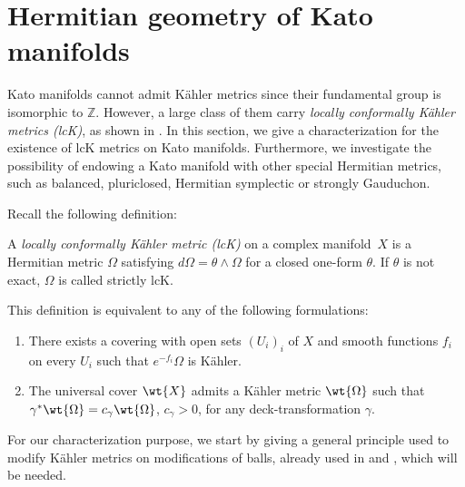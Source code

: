 \section{Hermitian geometry of Kato manifolds}\label{metrici}

Kato manifolds cannot admit Kähler metrics since their fundamental group is isomorphic to $\mathbb{Z}$. However, a large class of them carry \emph{locally conformally Kähler metrics (lcK)}, as shown in \cite[Th.\,2.2]{iop}. In this section, we give a characterization for the existence of lcK metrics on Kato manifolds. Furthermore, we investigate the possibility of endowing a Kato manifold with other special Hermitian metrics, such as balanced, pluriclosed, Hermitian symplectic or strongly Gauduchon.

Recall the following definition:
\begin{definition}\label{deflck} A \emph{locally conformally Kähler metric (lcK)} on a complex manifold~$X$ is a Hermitian metric $\Omega$ satisfying $d\Omega=\theta\wedge\Omega$ for a closed one-form $\theta$. If $\theta$ is not exact, $\Omega$ is called strictly lcK.
\end{definition}

This definition is equivalent to any of the following formulations:
\begin{enumerate}
\item There exists a covering with open sets $(U_i)_i$ of $X$ and smooth functions $f_i$ on every $U_i$ such that $e^{-f_i}\Omega$ is Kähler.
\item The universal cover $\wt{X}$ admits a Kähler metric $\wt{\Omega}$ such that $\gamma^*\wt{\Omega}=c_{\gamma}\wt{\Omega}$, $c_{\gamma}>0$, for any deck-transformation $\gamma$.
\end{enumerate}

For our characterization purpose, we start by giving a general principle used to modify Kähler metrics on modifications of balls, already used in \cite{bru} and \cite{iop}, which will be needed.

